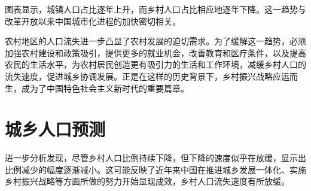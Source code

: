 图表显示，城镇人口占比逐年上升，而乡村人口占比相应地逐年下降。这一趋势与改革开放以来中国城市化进程的加快密切相关。


农村地区的人口流失进一步凸显了农村发展的迫切需求。为了缓解这一趋势，必须加强农村建设和政策吸引，提供更多的就业机会，改善教育和医疗条件，以及提高农民的生活水平，为农村居民创造更有吸引力的生活和工作环境，减缓乡村人口的流失速度，促进城乡协调发展。正是在这样的历史背景下，乡村振兴战略应运而生，成为了中国特色社会主义新时代的重要篇章。

\section{城乡人口预测}
进一步分析发现，尽管乡村人口比例持续下降，但下降的速度似乎在放缓，显示出比例减少的幅度逐渐减小。这可能反映了近年来中国在推进城乡发展一体化、实施乡村振兴战略等方面所做的努力开始显现成效，乡村人口流失速度有所放缓。

